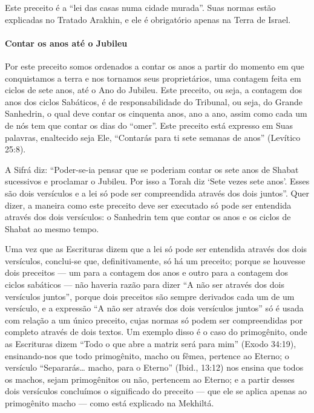 Este preceito é a ``lei das casas numa cidade murada''. Suas normas
estão explicadas no Tratado Arakhin, e ele é obrigatório apenas na Terra
de Israel.

\paragraph{Contar os anos até o Jubileu}

Por este preceito somos ordenados a contar os anos a partir do momento
em que conquistamos a terra e nos tornamos seus proprietários, uma
contagem feita em ciclos de sete anos, até o Ano do Jubileu. Este
preceito, ou seja, a contagem dos anos dos ciclos Sabáticos, é de
responsabilidade do Tribunal, ou seja, do Grande Sanhedrin, o qual deve
contar os cinquenta anos, ano a ano, assim como cada um de nós tem que
contar os dias do ``omer''. Este preceito está expresso em Suas
palavras, enaltecido seja Ele, ``Contarás para ti sete semanas de anos''
(Levítico 25:8).

A Sifrá diz: ``Poder-se-ia pensar que se poderiam contar os sete anos de
Shabat sucessivos e proclamar o Jubileu. Por isso a Torah diz `Sete
vezes sete anos'. Esses são dois versículos e a lei só pode ser
compreendida através dos dois juntos''. Quer dizer, a maneira como este
preceito deve ser executado só pode ser entendida através dos dois
versículos: o Sanhedrin tem que contar os anos e os ciclos de Shabat ao
mesmo tempo.

Uma vez que as Escrituras dizem que a lei só pode ser entendida através
dos dois versículos, conclui-se que, definitivamente, só há um preceito;
porque se houvesse dois preceitos --- um para a contagem dos anos e
outro para a contagem dos ciclos sabáticos --- não haveria razão para
dizer ``A não ser através dos dois versículos juntos'', porque dois
preceitos são sempre derivados cada um de um versículo, e a expressão
``A não ser através dos dois versículos juntos'' só é usada com relação
a um único preceito, cujas normas só podem
ser compreendidas por completo através de dois textos. Um exemplo disso
é o caso do primogênito, onde as Escrituras dizem ``Todo o que abre a
matriz será para mim'' (Exodo 34:19), ensinando-nos que todo
primogênito, macho ou fêmea, pertence ao Eterno; o versículo
``Separarás\ldots{} macho, para o Eterno'' (Ibid., 13:12) nos ensina que
todos os machos, sejam primogênitos ou não, pertencem ao Eterno; e a
partir desses dois versículos concluímos o significado do preceito ---
que ele se aplica apenas ao primogênito macho --- como está explicado na
Mekhiltá.

